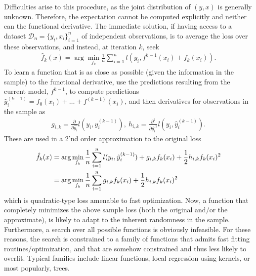 Difficulties arise to this procedure, as the joint distribution of $(y,x)$ is generally unknown. Therefore, the expectation cannot be computed explicitly and neither can the functional derivative.
The immediate solution, if having access to a dataset $\mathcal{D}_n=\{y_i,x_i\}_{i=1}^n$ of independent observations, is to average the loss over these observations, and instead, at iteration $k$, seek
\begin{align}
	\hat{f}_k(x) = \arg\min_{f_k} \frac{1}{n}\sum_{i=1}^{n} l\left( y_i, f^{k-1}(x_i)+f_k(x_i) \right).
\end{align}
To learn a function that is as close as possible (given the information in the sample) to the functional derivative, use the predictions resulting from the current model, $f^{k-1}$, to compute predictions $\hat{y}_i^{(k-1)}=f_0(x_i)+\dots+f^{(k-1)}(x_i)$, and then derivatives for observations in the sample as 
\begin{align}\label{eq:gb-derivatives}
g_{i,k} = \frac{\partial}{\partial \hat{y_i}}l(y_i,\hat{y}_i^{(k-1)})
,~
h_{i,k} = \frac{\partial^2}{\partial \hat{y_i}^2}l(y_i,\hat{y}_i^{(k-1)}).
\end{align}
These are used in a 2'nd order approximation to the original loss
\begin{align}\label{eq:gb-iteration-loss}
	\hat{f}_k(x) &= \arg\min_{f_k}
	\frac{1}{n}\sum_{i=1}^{n}l(y_i,\hat{y}_i^{(k-1)}) + g_{i,k}f_k(x_i) + \frac{1}{2}h_{i,k}f_k(x_i)^2
	\notag \\
	&= \arg\min_{f_k} \frac{1}{n}\sum_{i=1}^{n} g_{i,k}f_k(x_i) + \frac{1}{2}h_{i,k}f_k(x_i)^2
\end{align}
which is quadratic-type loss amenable to fast optimization.
Now, a function that completely minimizes the above sample loss (both the original and/or the approximate), is likely to adapt to the inherent randomness in the sample.
Furthermore, a search over all possible functions is obviously infeasible.
For these reasons, the search is constrained to a family of functions that admits fast fitting routines/optimization, and that are somehow constrained and thus less likely to overfit.
Typical families include linear functions, local regression using kernels, or most popularly, trees.


